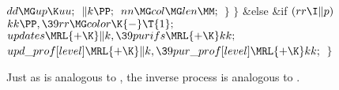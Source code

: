 ${}\\{dd}\MG\\{up}\K\\{uu};{}$\6
${}\|k\PP;{}$\6
${}\\{nn}\MG\\{col}\MG\\{len}\MM;{}$\6
\4${}\}{}$\2\6
\4${}\}{}$\5
\2\&{else} \&{if} ${}(\\{rr}\I\|p){}$\1\5
${}\\{kk}\PP,\39\\{rr}\MG\\{color}\K{-}\T{1};{}$\2\2\6
${}\\{updates}\MRL{+{\K}}\|k,\39\\{purifs}\MRL{+{\K}}\\{kk};{}$\6
${}\\{upd\_prof}[\\{level}]\MRL{+{\K}}\|k,\39\\{pur\_prof}[\\{level}]\MRL{+{%
\K}}\\{kk};{}$\6
\4${}\}{}$\2\par
\fi

Just as  is analogous to , the inverse
process is analogous
to .

